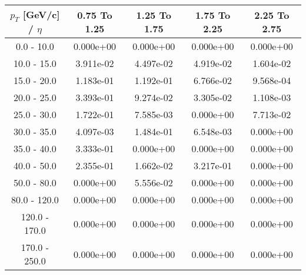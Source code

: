 \begin{tabular}{|c|c|c|c|c|}\hline 
$p_T$ [GeV/c] / $\eta$  & 0.75 To 1.25 & 1.25 To 1.75 & 1.75 To 2.25 & 2.25 To 2.75 \\ 
 \hline 
0.0 - 10.0 & 0.000e+00 & 0.000e+00 & 0.000e+00 & 0.000e+00 \\ 
10.0 - 15.0 & 3.911e-02 & 4.497e-02 & 4.919e-02 & 1.604e-02 \\ 
15.0 - 20.0 & 1.183e-01 & 1.192e-01 & 6.766e-02 & 9.568e-04 \\ 
20.0 - 25.0 & 3.393e-01 & 9.274e-02 & 3.305e-02 & 1.108e-03 \\ 
25.0 - 30.0 & 1.722e-01 & 7.585e-03 & 0.000e+00 & 7.713e-02 \\ 
30.0 - 35.0 & 4.097e-03 & 1.484e-01 & 6.548e-03 & 0.000e+00 \\ 
35.0 - 40.0 & 3.333e-01 & 0.000e+00 & 0.000e+00 & 0.000e+00 \\ 
40.0 - 50.0 & 2.355e-01 & 1.662e-02 & 3.217e-01 & 0.000e+00 \\ 
50.0 - 80.0 & 0.000e+00 & 5.556e-02 & 0.000e+00 & 0.000e+00 \\ 
80.0 - 120.0 & 0.000e+00 & 0.000e+00 & 0.000e+00 & 0.000e+00 \\ 
120.0 - 170.0 & 0.000e+00 & 0.000e+00 & 0.000e+00 & 0.000e+00 \\ 
170.0 - 250.0 & 0.000e+00 & 0.000e+00 & 0.000e+00 & 0.000e+00 \\ 
 \hline 
\end{tabular} 
